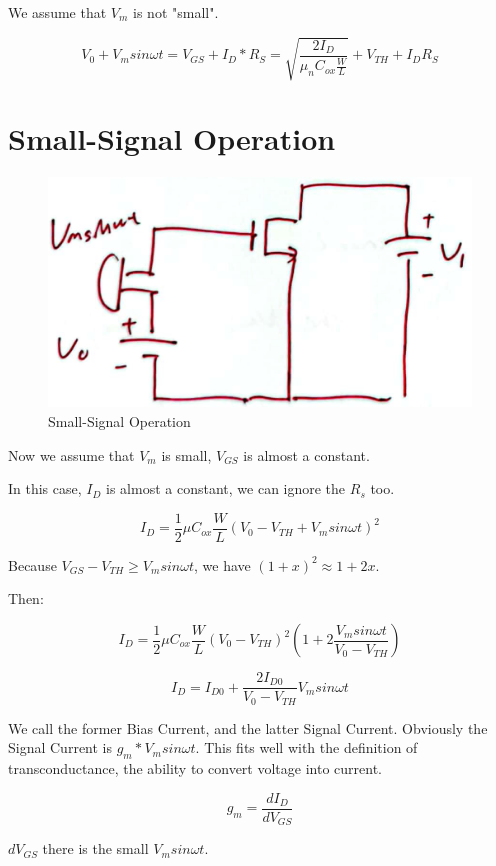 \documentclass[fontset=windows]{article}
\begin{document}
We assume that $V_m$ is not "small". 

$$V_0+V_m sin\omega t=V_{GS}+I_D*R_S=\sqrt{\frac{2I_D}{\mu_nC_{ox}\frac{W}{L}}}+V_{TH}+I_DR_S$$

\section*{Small-Signal Operation}

\begin{figure}[htbp]
    \centering
    \includegraphics[scale=0.6]{6.jpg}
    \captionsetup{labelformat=empty}
    \caption{Small-Signal Operation}
    \label{6}
\end{figure}

Now we assume that $V_m$ is small, $V_{GS}$ is almost a constant. 

In this case, $I_D$ is almost a constant, we can ignore the $R_s$ too. 

$$I_D=\frac{1}{2} \mu C_{ox}\frac{W}{L}(V_0-V_{TH}+V_{m}sin\omega t)^2$$

Because $V_{GS}-V_{TH}\geq V_msin\omega t$, we have $(1+x)^2\approx 1+2x$. 

Then: 

$$I_D=\frac{1}{2} \mu C_{ox}\frac{W}{L}(V_{0}-V_{TH})^2(1+2\frac{V_msin\omega t}{V_0-V_{TH}})$$

$$I_D=I_{D0}+\frac{2I_{D0}}{V_0-V_{TH}}V_m sin\omega t$$

We call the former Bias Current, and the latter Signal Current. Obviously the Signal Current is $g_m*V_msin\omega t$.  
This fits well with the definition of transconductance, the ability to convert voltage into current. 

$$g_m=\frac{dI_D}{dV_{GS}}$$

$dV_{GS}$ there is the small $V_msin\omega t$.  
\end{document}
